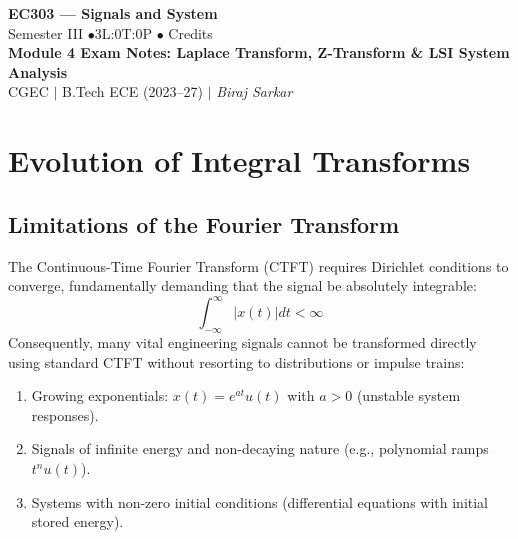\documentclass[12pt,a4paper]{article}
\begin{document}
\begin{center}
  {\LARGE\bfseries\color{myred} EC303 --- Signals and System}\\[5pt]
  {\normalsize\color{mydark} Semester III \quad$\bullet$\quad 3L:0T:0P \quad$\bullet$ Credits}\\[3pt]
  {\normalsize\color{myteal}\textbf{Module 4 Exam Notes: Laplace Transform, Z-Transform \& LSI System Analysis}}\\[3pt]
  {\small\color{mydark} CGEC \;$|$\; B.Tech ECE (2023--27) \;$|$\; \textit{Biraj Sarkar}}
\end{center}
\vspace{2pt}
\noindent{\color{myred}\rule{\linewidth}{1.5pt}}
\vspace{2pt}

\hypersetup{linkcolor=mydark}
\tableofcontents
\hypersetup{linkcolor=myteal}
\newpage

\section{Evolution of Integral Transforms}

\subsection{Limitations of the Fourier Transform}
The Continuous-Time Fourier Transform (CTFT) requires Dirichlet conditions to converge, fundamentally demanding that the signal be absolutely integrable:
\begin{equation}
  \int_{-\infty}^{\infty} |x(t)| dt < \infty
\end{equation}
Consequently, many vital engineering signals cannot be transformed directly using standard CTFT without resorting to distributions or impulse trains:
\begin{enumerate}[topsep=2pt, itemsep=2pt]
  \item Growing exponentials: $x(t) = e^{at} u(t)$ with $a > 0$ (unstable system responses).
  \item Signals of infinite energy and non-decaying nature (e.g., polynomial ramps $t^n u(t)$).
  \item Systems with non-zero initial conditions (differential equations with initial stored energy).
\end{enumerate}
\end{document}
